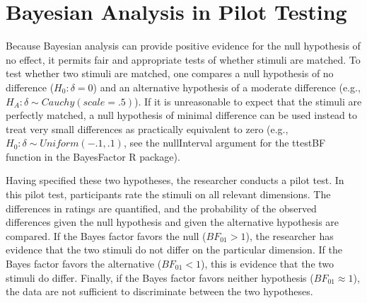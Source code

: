 \documentclass[fignum,nobf,man]{apa}
\begin{document}
\section{Bayesian Analysis in Pilot Testing}
Because Bayesian analysis can provide positive evidence for the null hypothesis of no effect, it permits fair and appropriate tests of whether stimuli are matched. To test whether two stimuli are matched, one compares a null hypothesis of no difference ($H_0: \delta{} = 0$) and an alternative hypothesis of a moderate difference (e.g., $H_A: \delta{} \sim{} Cauchy(scale = .5)$). If it is unreasonable to expect that the stimuli are perfectly matched, a null hypothesis of minimal difference can be used instead to treat very small differences as practically equivalent to zero (e.g., $H_0: \delta{} \sim{} Uniform(-.1, .1)$, see the nullInterval argument for the ttestBF function in the BayesFactor R package). 

Having specified these two hypotheses, the researcher conducts a pilot test. In this pilot test, participants rate the stimuli on all relevant dimensions.  The differences in ratings are quantified, and the probability of the observed differences given the null hypothesis and given the alternative hypothesis are compared. If the Bayes factor favors the null ($BF_{01} > 1$), the researcher has evidence that the two stimuli do not differ on the particular dimension. If the Bayes factor favors the alternative ($BF_{01} < 1$), this is evidence that the two stimuli do differ. Finally, if the Bayes factor favors neither hypothesis ($BF_{01} \approx 1$), the data are not sufficient to discriminate between the two hypotheses.
 
\end{document}
